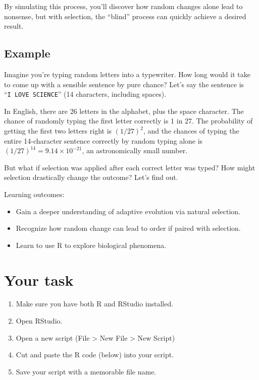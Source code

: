 \documentclass[
  a4paper]{book}
\providecommand{\tightlist}{%
  \setlength{\itemsep}{0pt}\setlength{\parskip}{0pt}}
\begin{document}
By simulating this process, you'll discover how random changes alone lead to nonsense, but with selection, the ``blind'' process can quickly achieve a desired result.

\subsection{Example}\label{example}

Imagine you're typing random letters into a typewriter. How long would it take to come up with a sensible sentence by pure chance? Let's say the sentence is ``\texttt{I\ LOVE\ SCIENCE}'' (14 characters, including spaces).

In English, there are 26 letters in the alphabet, plus the space character. The chance of randomly typing the first letter correctly is 1 in 27. The probability of getting the first two letters right is \((1/27)^2\), and the chances of typing the entire 14-character sentence correctly by random typing alone is \((1/27)^{14} = 9.14 \times 10^{-21}\), an astronomically small number.

But what if selection was applied after each correct letter was typed? How might selection drastically change the outcome? Let's find out.

\begin{do-something}
Learning outcomes:

\begin{itemize}
\tightlist
\item
  Gain a deeper understanding of adaptive evolution via natural
  selection.
\item
  Recognize how random change can lead to order if paired with
  selection.
\item
  Learn to use R to explore biological phenomena.
\end{itemize}
\end{do-something}

\section{Your task}\label{your-task}

\begin{enumerate}
\def\labelenumi{\arabic{enumi}.}
\setcounter{enumi}{-1}
\tightlist
\item
  Make sure you have both R and RStudio installed.
\item
  Open RStudio.
\item
  Open a new script (File \textgreater{} New File \textgreater{} New Script)
\item
  Cut and paste the R code (below) into your script.
\item
  Save your script with a memorable file name.
\end{enumerate}
\end{document}
